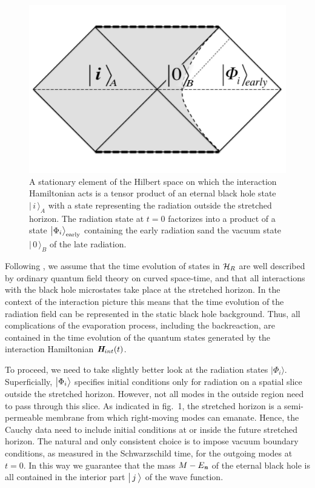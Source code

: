 \documentclass[12pt]{article}%
\begin{document}
\begin{figure}[t]
\begin{center}
\includegraphics[scale=.3]{BH-states.pdf}
\caption{\small
{A stationary element of the Hilbert space on which the interaction Hamiltonian acts is a tensor product of an eternal black hole state 
$\bigl|\,i\,\bigr\rangle_{A}$ with a state representing the radiation outside the stretched horizon. The radiation state at $t=0$ factorizes into a product of a state $\bigl|\Phi_i \bigr\rangle_{\rm early}$ 
containing the early radiation sand the vacuum state $\bigl|\,0\,\bigr\rangle_B$ of the late radiation.}}
\end{center}
\vspace{-0.5cm}
\end{figure} 

 Following \cite{amps}, we assume that the time evolution of states in ${\cal H}_R$  are well described by ordinary quantum field theory on curved space-time, and that all interactions with the
black hole microstates take place at the stretched horizon. In the context of the interaction picture this means that the time evolution of the radiation field can be represented in the static black hole background. Thus, all complications of the evaporation process, including the backreaction, are contained in the time evolution 
of the quantum states generated by the interaction Hamiltonian $\textit{\textbf H}_{int}(t)$. 
 


To proceed, we need to take slightly better look at the radiation states $\bigl|\Phi_i\bigr\rangle$. Superficially,  $\bigl|\Phi_i\bigr\rangle$ 
specifies initial conditions only for radiation on a spatial slice outside the stretched horizon. However, not all modes in the outside region need to pass through this slice. As indicated in fig.~1, the stretched horizon is a semi-permeable membrane from which right-moving modes can emanate.
Hence, the Cauchy data need to include initial conditions at or inside the future stretched horizon.  The natural and only consistent choice is to impose vacuum boundary conditions, as measured in the Schwarzschild time, for the outgoing modes at $t=0$. 
In this way we guarantee that the mass $M-E_{ \textit{\textbf n}}$ of the eternal black hole is all contained in the interior part $\bigl|\, j \, \bigr\rangle$ of the wave function.
\end{document}
